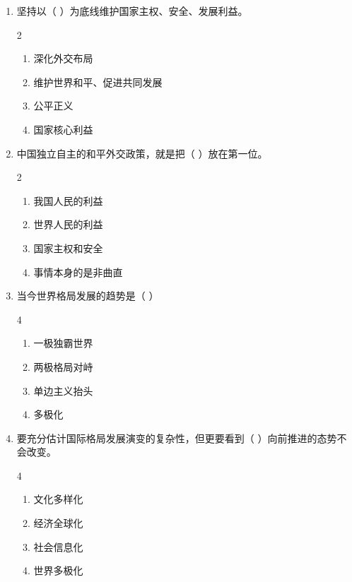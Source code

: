 \documentclass[a4paper,11pt]{ctexart}
\begin{document}
\begin{enumerate}[start=4]
    \item 坚持以（ ）为底线维护国家主权、安全、发展利益。
    \begin{multicols}{2}
    \begin{enumerate}
        \item 深化外交布局
        \item 维护世界和平、促进共同发展
        \item 公平正义
        \item 国家核心利益
    \end{enumerate}
    \end{multicols}

    \item 中国独立自主的和平外交政策，就是把（ ）放在第一位。
    \begin{multicols}{2}
    \begin{enumerate}
        \item 我国人民的利益
        \item 世界人民的利益
        \item 国家主权和安全
        \item 事情本身的是非曲直
    \end{enumerate}
    \end{multicols}

    \item 当今世界格局发展的趋势是（ ）
    \begin{multicols}{4}
    \begin{enumerate}
        \item 一极独霸世界
        \item 两极格局对峙
        \item 单边主义抬头
        \item 多极化
    \end{enumerate}
    \end{multicols}

    \item 要充分估计国际格局发展演变的复杂性，但更要看到（ ）向前推进的态势不会改变。
    \begin{multicols}{4}
    \begin{enumerate}
        \item 文化多样化
        \item 经济全球化
        \item 社会信息化
        \item 世界多极化
    \end{enumerate}
    \end{multicols}


\end{enumerate}
\end{document}
